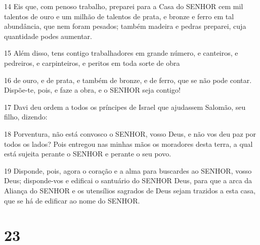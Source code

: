 \par 14 Eis que, com penoso trabalho, preparei para a Casa do SENHOR cem mil talentos de ouro e um milhão de talentos de prata, e bronze e ferro em tal abundância, que nem foram pesados; também madeira e pedras preparei, cuja quantidade podes aumentar.
\par 15 Além disso, tens contigo trabalhadores em grande número, e canteiros, e pedreiros, e carpinteiros, e peritos em toda sorte de obra
\par 16 de ouro, e de prata, e também de bronze, e de ferro, que se não pode contar. Dispõe-te, pois, e faze a obra, e o SENHOR seja contigo!
\par 17 Davi deu ordem a todos os príncipes de Israel que ajudassem Salomão, seu filho, dizendo:
\par 18 Porventura, não está convosco o SENHOR, vosso Deus, e não vos deu paz por todos os lados? Pois entregou nas minhas mãos os moradores desta terra, a qual está sujeita perante o SENHOR e perante o seu povo.
\par 19 Disponde, pois, agora o coração e a alma para buscardes ao SENHOR, vosso Deus; disponde-vos e edificai o santuário do SENHOR Deus, para que a arca da Aliança do SENHOR e os utensílios sagrados de Deus sejam trazidos a esta casa, que se há de edificar ao nome do SENHOR.

\chapter{23}

